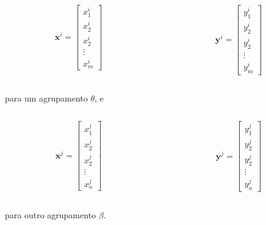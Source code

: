 \documentclass[aspectratio=10]{beamer} %
\begin{document}
\begin{frame}
	\begin{columns}
		\begin{column}{0.5\textwidth}
		\begin{equation}
		\textbf{x}^{i}=
		\begin{bmatrix} 
		x_{1}^{i} \\
		x_{2}^{i} \\
		x_{2}^{i} \\
		\vdots \\
		x_{m}^{i}
		\end{bmatrix} \nonumber
		\end{equation}
        \end{column}
		\begin{column}{0.5\textwidth}
		\begin{equation}
		\textbf{y}^{i}=
		\begin{bmatrix} 
		y_{1}^{i} \\
		y_{2}^{i} \\
		y_{2}^{i} \\
		\vdots \\
		y_{m}^{i}
		\end{bmatrix} \nonumber
		\end{equation}
	    \end{column}
	\end{columns}	
	para um agrupamento $\theta$, e 
\pause
\begin{columns}
	\begin{column}{0.5\textwidth}
		\begin{equation}
		\textbf{x}^{j}=
		\begin{bmatrix} 
		x_{1}^{j} \\
		x_{2}^{j} \\
		x_{2}^{j} \\
		\vdots \\
		x_{n}^{j}
		\end{bmatrix} \nonumber
		\end{equation}
        \end{column}
        \begin{column}{0.5\textwidth}	
		\begin{equation}
		\textbf{y}^{j}=
		\begin{bmatrix} 
		y_{1}^{j} \\
		y_{2}^{j} \\
		y_{2}^{j} \\
		\vdots \\
		y_{n}^{j}
		\end{bmatrix} \nonumber
		\end{equation}
	    \end{column}
\end{columns}
	para outro agrupamento  $\beta$. 
\end{frame}
\end{document}
